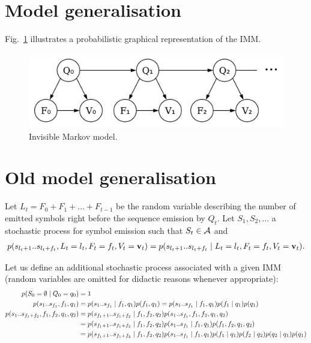 \section{Model generalisation}

Fig.~\ref{fig:imm} illustrates a probabilistic graphical representation of the IMM.

\begin{figure}[htbp]
\centering
\includegraphics[width=.45\linewidth]{figure/imm}
\caption{Invisible Markov model.}%
\label{fig:imm}
\end{figure}


\newpage
\newpage

\section{Old model generalisation}

Let $L_t=F_0+F_1+\dots + F_{t-1}$ be the random variable describing the number of emitted symbols right
before the sequence emission by $Q_t$.
Let $S_1, S_2, \dots$ a stochastic process for symbol emission such that $S_t\in\mathcal{A}$
and
\begin{align*}
    p(s_{l_t+1} .. s_{l_t+f_t}, L_t=l_t, F_t=f_t, V_t=\mathbf v_t)
        = p(s_{l_t+1} .. s_{l_t+f_t}\;|\; L_t=l_t, F_t=f_t, V_t=\mathbf v_t).
\end{align*}

Let us define an additional stochastic process  associated with a given IMM
(random variables are omitted for didactic reasons whenever appropriate):
\begin{align*}
    p(S_0=\emptyset\;|\; Q_0=q_0)
        &=1\\
    p(s_1 .. s_{f_1},f_1,q_1)
        &= p(s_1 .. s_{f_1}\;|\; f_1,q_1)p(f_1,q_1) = p(s_1 .. s_{f_1}\;|\; f_1,q_1)p(f_1\;|\; q_1)p(q_1)\\
    p(s_1 .. s_{f_1+f_2},f_1,f_2,q_1,q_2)
        &= p(s_{f_1+1} .. s_{f_1+f_2}\;|\; f_1, f_2, q_2)p(s_1 .. s_{f_1}, f_1, f_2, q_1, q_2)\\
        &= p(s_{f_1+1} .. s_{f_1+f_2}\;|\; f_1, f_2, q_2)p(s_1 .. s_{f_1}\;|\; f_1, q_1) p(f_1, f_2, q_1, q_2)\\
        &= p(s_{f_1+1} .. s_{f_1+f_2}\;|\; f_1, f_2, q_2)p(s_1 .. s_{f_1}\;|\; f_1, q_1) p(f_1\;|\; q_1) p(f_2\;|\; q_2)p(q_2\;|\; q_1)p(q_1)
\end{align*}

